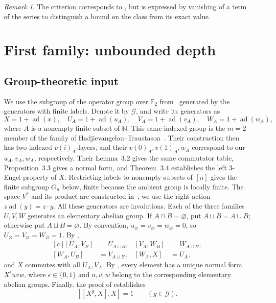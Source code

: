 \documentclass[11pt,a4paper]{article}
\theoremstyle{definition}
\theoremstyle{remark}
\newtheorem{remark}[theorem]{Remark}
\newcommand{\ad}{\operatorname{ad}}
\newcommand{\F}{\mathbb F}
\begin{document}
\begin{remark}
The criterion corresponds to \cite[Proposition~3.2]{BCNW},
but is expressed by vanishing of a term of the series to distinguish
a bound on the class from its exact value.
\end{remark}

\section{First family: unbounded depth}\label{sec:first}

\subsection{Group-theoretic input}

We use the subgroup of the operator group over \(\F_2\) from~\cite{NTT}
generated by the generators with finite labels. Denote it
by \(\mathscr G\), and write its generators as
\[
 X=1+\ad(x),\quad U_A=1+\ad(u_A),\quad
 V_A=1+\ad(v_A),\quad W_A=1+\ad(w_A),
\]
where \(A\) is a nonempty finite subset of \(\mathbb N\).
This same indexed group is the \(m=2\) member of the family of
Hadjievangelou--Traustason~\cite{HT}. Their construction then has two
indexed \(v(i)_A\)-layers, and their \(v(0)_A,v(1)_A,w_A\) correspond to
our \(u_A,v_A,w_A\), respectively. Their Lemma~3.2 gives the same
commutator table, Proposition~3.3 gives a normal form, and Theorem~3.4
establishes the left \(3\)-Engel property of \(X\). Restricting labels to
nonempty subsets of \([n]\) gives the finite subgroup \(G_n\) below, finite
because the ambient group is locally finite.
The space \(V^*\) and its product are constructed
in~\cite[Section~2, before Lemma~2.2]{NTT}; we use the right action
\(z\ad(y)=z\cdot y\).
All these generators are involutions.
Each of the three families \(U,V,W\) generates an elementary abelian group.
If \(A\cap B=\varnothing\), put \(A\sqcup B=A\cup B\);
otherwise put \(A\sqcup B=\varnothing\).
By convention, \(u_\varnothing=v_\varnothing=w_\varnothing=0\),
so \(U_\varnothing=V_\varnothing=W_\varnothing=1\).
By \cite[Lemma~2.3]{NTT},
\begin{equation}\label{eq:nttcomm}
 \begin{aligned}[c]
 [U_A,V_B]&=U_{A\sqcup B},&
 [V_A,W_B]&=W_{A\sqcup B},\\
 [W_A,U_B]&=V_{A\sqcup B},&
 [W_A,X]&=U_A,
 \end{aligned}
\end{equation}
and \(X\) commutes with all \(U_A,V_A\).
By \cite[Proposition~2.4]{NTT}, every element has a unique
normal form \(X^\epsilon uvw\), where \(\epsilon\in\{0,1\}\)
and \(u,v,w\) belong to the corresponding elementary abelian groups.
Finally, the proof of \cite[Theorem~2.5]{NTT} establishes
\begin{equation}\label{eq:pairengel}
 [[X^g,X],X]=1\qquad(g\in\mathscr G).
\end{equation}
\end{document}
